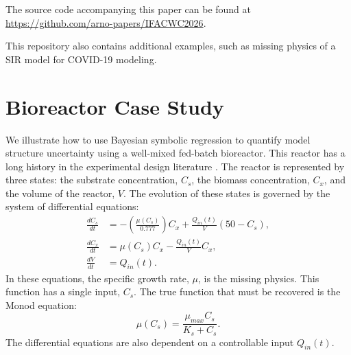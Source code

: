 \documentclass{ifacconf}
\begin{document}
	The source code accompanying this paper can be found at \url{https://github.com/arno-papers/IFACWC2026}.
	
	This repository also contains additional examples, such as missing physics of a SIR model for COVID-19 modeling.
	\section{Bioreactor Case Study}
	We illustrate how to use Bayesian symbolic regression to quantify model structure uncertainty using a well-mixed fed-batch bioreactor.
	This reactor has a long history in the experimental design literature \citep{versyck}.
	The reactor is represented by three states:
	the substrate concentration, $C_s$,	the biomass concentration, $C_x$, and the volume of the reactor, $V$.
	The evolution of these states is governed by the system of differential equations:
		\begin{equation}\label{eq:bioreactor}
		\begin{aligned}
			\frac{dC_s}{dt} &= -\left(\frac{\mu(C_s)}{0.777}\right) C_x + \frac{Q_{in}(t)}{V}(50 - C_s),\\
			\frac{dC_x}{dt} &= \mu(C_s) C_x - \frac{Q_{in}(t)}{V}C_x,\\
			\frac{dV}{dt} &= Q_{in}(t).
		\end{aligned}
	\end{equation}
	In these equations, the specific growth rate, $\mu$, is the missing physics.
	This function has a single input, $C_s$.
	The true function that must be recovered is the Monod equation:
	\begin{equation}
		\mu(C_s) = \frac{\mu_{max}C_s}{K_s + C_s}.
	\end{equation}
	The differential equations are also dependent on a controllable input $Q_{in}(t)$.
	
\end{document}
